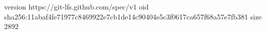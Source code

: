 version https://git-lfs.github.com/spec/v1
oid sha256:11abaf4fe71977c8469922e7cb1de14c90404e5c3f0617ca657f68a57e7fb381
size 2892
